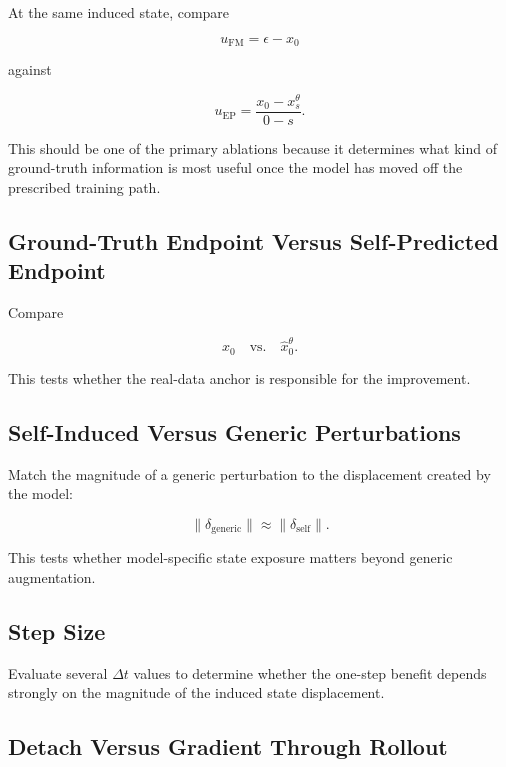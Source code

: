 \documentclass[11pt]{article}
\begin{document}
At the same induced state, compare

\begin{equation}
\boxed{
u_{\mathrm{FM}}=\epsilon-x_0
}
\end{equation}

against

\begin{equation}
\boxed{
u_{\mathrm{EP}}
=
\frac{x_0-x_s^\theta}{0-s}.
}
\end{equation}

This should be one of the primary ablations because it determines what kind of
ground-truth information is most useful once the model has moved off the
prescribed training path.

\subsection{Ground-Truth Endpoint Versus Self-Predicted Endpoint}

Compare

\begin{equation}
x_0
\quad\text{vs.}\quad
\hat{x}_0^\theta.
\end{equation}

This tests whether the real-data anchor is responsible for the improvement.

\subsection{Self-Induced Versus Generic Perturbations}

Match the magnitude of a generic perturbation to the displacement created by
the model:

\begin{equation}
\|\delta_{\mathrm{generic}}\|
\approx
\|\delta_{\mathrm{self}}\|.
\end{equation}

This tests whether model-specific state exposure matters beyond generic
augmentation.

\subsection{Step Size}

Evaluate several $\Delta t$ values to determine whether the one-step benefit
depends strongly on the magnitude of the induced state displacement.

\subsection{Detach Versus Gradient Through Rollout}
\end{document}
